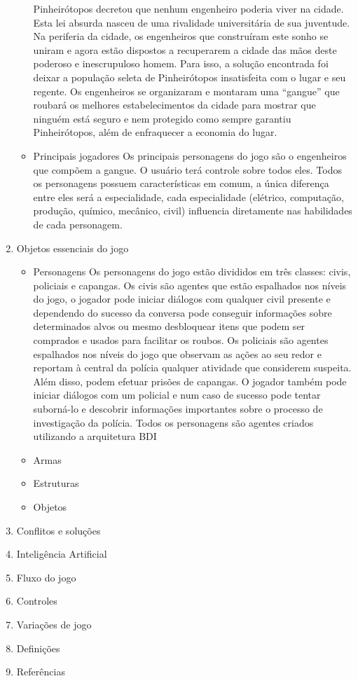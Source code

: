 \begin{enumerate}
\begin{itemize}
Pinheirótopos decretou que nenhum engenheiro poderia viver na cidade. Esta lei absurda nasceu de uma rivalidade universitária de sua juventude.
Na periferia da cidade, os engenheiros que construíram este sonho se uniram e agora estão dispostos a recuperarem a cidade das mãos deste poderoso e inescrupuloso homem. Para isso, a solução encontrada foi deixar a população seleta de Pinheirótopos insatisfeita com o lugar e seu regente. Os engenheiros se organizaram e montaram uma “gangue” que roubará os melhores estabelecimentos da cidade para mostrar que ninguém está seguro e nem protegido como sempre garantiu Pinheirótopos, além de enfraquecer a economia do lugar.
\item Principais jogadores
Os principais personagens do jogo são o engenheiros que compõem a gangue. O usuário terá controle sobre todos eles.
Todos os personagens possuem características em comum, a única diferença entre eles será a especialidade, cada especialidade (elétrico, computação, produção, químico, mecânico, civil) influencia diretamente nas habilidades de cada personagem.
\end{itemize}
\item Objetos essenciais do jogo
\begin{itemize}
\item Personagens
Os personagens do jogo estão divididos em três classes: civis, policiais e capangas.
Os civis são agentes que estão espalhados nos níveis do jogo, o jogador pode iniciar diálogos com qualquer civil presente e dependendo do sucesso da conversa pode conseguir informações sobre determinados alvos ou mesmo desbloquear itens que podem ser comprados e usados para facilitar os roubos.
Os policiais são agentes espalhados nos níveis do jogo que observam as ações ao seu redor e reportam à central da polícia qualquer atividade que considerem suspeita. Além disso, podem efetuar prisões de capangas. O jogador também pode iniciar diálogos com um policial e num caso de sucesso pode tentar suborná-lo e descobrir informações importantes sobre o processo de investigação da polícia.
Todos os personagens são agentes criados utilizando a arquitetura BDI
\item Armas
\item Estruturas
\item Objetos
\end{itemize}
\item Conflitos e soluções
\item Inteligência Artificial
\item Fluxo do jogo
\item Controles
\item Variações de jogo
\item Definições
\item Referências
\end{enumerate}
